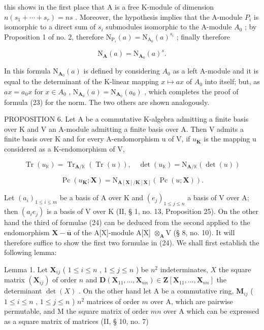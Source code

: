 this shows in the first place that A is a free K-module of dimension \(n(s_{1} + \cdots + s_{r}) = ns\) . Moreover, the hypothesis implies that the A-module \(P_{i}\) is isomorphic to a direct sum of \(s_{i}\) submodules isomorphic to the A-module \(A_{0}\) ; by Proposition 1 of no. 2, therefore \(\mathrm{N}_{\mathrm{P}_{i}}(a) = \mathrm{N}_{\mathrm{A}_{0}}(a)^{s_{i}}\) ; finally therefore

\[
\mathrm{N} _ {\mathbf {A}} (a) = \mathrm{N} _ {\mathbf {A} _ {0}} (a) ^ {s}.
\]

In this formula \(\mathrm{N}_{\mathbf{A}_{0}}(a)\) is defined by considering \(A_{0}\) as a left A-module and it is equal to the determinant of the K-linear mapping \(x \mapsto ax\) of \(A_{0}\) into itself; but, as \(ax = a_{0}x\) for \(x \in A_{0}\) , \(\mathrm{N}_{\mathbf{A}_{0}}(a) = \mathrm{N}_{\mathbf{A}_{0}}(a_{0})\) , which completes the proof of formula (23) for the norm. The two others are shown analogously.

PROPOSITION 6. Let A be a commutative K-algebra admitting a finite basis over K and V an A-module admitting a finite basis over A. Then V admits a finite basis over K and for every A-endomorphism u of V, if \(u_{\mathbf{K}}\) is the mapping u considered as a K-endomorphism of V,

\[
\operatorname{Tr} (u _ {\mathbb {K}}) = \operatorname{Tr} _ {\mathbf {A} / \mathbb {K}} (\operatorname{Tr} (u)), \quad \det (u _ {\mathbb {K}}) = \mathrm{N} _ {\mathbf {A} / \mathbb {K}} (\det (u))\tag{24}
\]

\[
\operatorname{Pc} (u _ {\mathbf {K}}; \mathbf {X}) = \mathrm{N} _ {\mathbf {A} [ \mathbf {X} ] / \mathbf {K} [ \mathbf {X} ]} (\operatorname{Pc} (u; \mathbf {X})).
\]

Let \((a_{i})_{1\leqslant i\leqslant m}\) be a basis of A over K and \((e_{j})_{1\leqslant j\leqslant n}\) a basis of V over A; then \((a_{i}e_{j})\) is a basis of V over K (II, § 1, no. 13, Proposition 25). On the other hand the third of formulae (24) can be deduced from the second applied to the endomorphism \(\mathbf{X} - \bar{\boldsymbol{u}}\) of the A{[}X{]}-module A{[}X{]} \(\otimes_{\mathbf{A}}\mathrm{V}\) (§ 8, no. 10). It will therefore suffice to show the first two formulae in (24). We shall first establish the following lemma:

Lemma 1. Let \(\mathbf{X}_{ij}\) ( \(1 \leqslant i \leqslant n\) , \(1 \leqslant j \leqslant n\) ) be \(n^2\) indeterminates, \(X\) the square matrix \((\mathbf{X}_{ij})\) of order \(n\) and \(\mathbf{D}(\mathbf{X}_{11}, \ldots, \mathbf{X}_{nn}) \in \mathbf{Z}[\mathbf{X}_{11}, \ldots, \mathbf{X}_{nn}]\) the determinant \(\det(X)\) . On the other hand let A be a commutative ring, \(\mathbf{M}_{ij}\) ( \(1 \leqslant i \leqslant n\) , \(1 \leqslant j \leqslant n\) ) \(n^2\) matrices of order \(m\) over A, which are pairwise permutable, and M the square matrix of order \(mn\) over A which can be expressed as a square matrix of matrices (II, § 10, no. 7)

